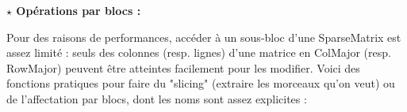 \documentclass[11pt]{article}
\begin{document}
\begin{itemize}
\vspace{5 mm}
	
\end{itemize}

\noindent
\textbf{$\star$ Opérations par blocs :}~~ 

\vspace{5 mm}

\noindent
Pour des raisons de performances, accéder à un sous-bloc d'une SparseMatrix est assez limité : seuls des colonnes (resp. lignes) d'une matrice en ColMajor (resp. RowMajor) peuvent être atteintes facilement pour les modifier. Voici des fonctions pratiques pour faire du "slicing" (extraire les morceaux qu'on veut) ou de l'affectation par blocs, dont les noms sont assez explicites :

\vspace{5 mm}	
	
\begin{center}
\end{center}
\end{document}
